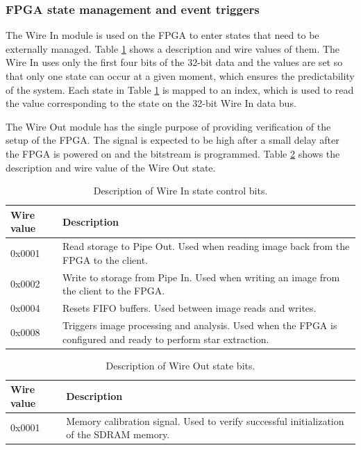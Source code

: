\documentclass[12pt]{report}
\begin{document}
\subsubsection{FPGA state management and event triggers}
The Wire In module is used on the FPGA to enter states that need to be externally managed. Table \ref{table:wireInState} shows a description and wire values of them. The Wire In uses only the first four bits of the 32-bit data and the values are set so that only one state can occur at a given moment, which ensures the predictability of the system. Each state in Table \ref*{table:wireInState} is mapped to an index, which is used to read the value corresponding to the state on the 32-bit Wire In data bus.
\par
The Wire Out module has the single purpose of providing verification of the setup of the FPGA. The signal is expected to be high after a small delay after the FPGA is powered on and the bitstream is programmed. Table \ref*{table:wireOutState} shows the description and wire value of the Wire Out state.

\begin{table}[h]
    \begin{tabular}{|p{3cm}|p{10cm}|}
        \hline
        \textbf{Wire value}&\textbf{Description}\\
        \hline
        0x0001&Read storage to Pipe Out. Used when reading image back from the FPGA to the client.\\
        \hline
        0x0002&Write to storage from Pipe In. Used when writing an image from the client to the FPGA.\\ 
        \hline
        0x0004&Resets FIFO buffers. Used between image reads and writes. \\
        \hline
        0x0008&Triggers image processing and analysis. Used when the FPGA is configured and ready to perform star extraction.\\
        \hline
    \end{tabular}
    \caption{Description of Wire In state control bits.}
    \label{table:wireInState}
\end{table}
\begin{table}[h]
    \begin{tabular}{|p{3cm}|p{10cm}|}
        \hline
        \textbf{Wire value}&\textbf{Description}\\
        \hline
        0x0001&Memory calibration signal. Used to verify successful initialization of the SDRAM memory.\\
        \hline
    \end{tabular}
    \caption{Description of Wire Out state bits.}
    \label{table:wireOutState}
\end{table}
\end{document}
